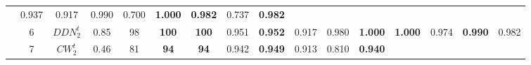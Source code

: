 \begin{table}[tph]
\begin{adjustbox}{angle=90}
{\begin{tabular}{c|c|cc|ccc|ccc|ccc|ccc}
                                                                        & 0.937
                                                                        & 0.917                          &
                0.990                                                   & 0.700
                                                                        &
                \textbf{1.000}
                                                                        &
                \textbf{0.982}
                                                                        & 0.737
                                                                        &
                \textbf{0.982}
                \\
                                                                        & 6
                                                                        & $DDN_{2}^{t}$                  & 0.85 & 98 &
                \textbf{100}
                                                                        &
                \textbf{100}
                                                                        & 0.951
                                                                        &
                \textbf{0.952}
                                                                        & 0.917
                                                                        & 0.980                          &
                \textbf{1.000}
                                                                        &
                \textbf{1.000}
                                                                        & 0.974
                                                                        &
                \textbf{0.990}
                                                                        & 0.982
                \\
                                                                        & 7
                                                                        & $CW_{2}^{t}$                   & 0.46 & 81 &
                \textbf{94}
                                                                        &
                \textbf{94}
                                                                        & 0.942
                                                                        &
                \textbf{0.949}
                                                                        & 0.913
                                                                        & 0.810                          &
                \textbf{0.940}

\end{tabular}}
\end{adjustbox}
\end{table}
